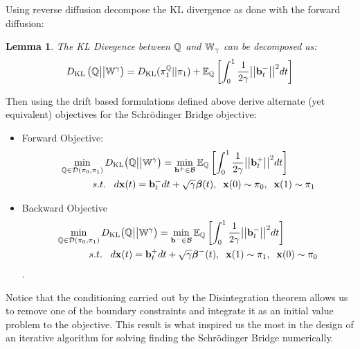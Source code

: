 \documentclass[a4paper,12pt,twoside,openright]{report}
\newtheorem{lemma}[theorem]{Lemma}
\theoremstyle{definition}
\begin{document}
Using reverse diffusion \cite{pavon1991free} decompose the KL divergence as done with the forward diffusion:
\begin{lemma}\citep{pavon1991free}
    The KL Divegence between ${\mathbb{Q}}$ and $\mathbb{W}_{\gamma}$ can be decomposed as:
\begin{align}\label{eq:free_energy_1}
     D_{\mathrm{KL}}\left({\mathbb{Q}} \big|\big| \mathbb{W}^{\gamma}\right) = D_{\mathrm{KL}}(\pi^{{\mathbb{Q}}}_1 || \pi_1) + \mathbb{E}_{\mathbb{Q}}\left[\int_0^1\frac{1}{2\gamma} \big|\big|{\mathbf{b}}^{-}_t\big|\big|^2 dt\right]
\end{align}
\end{lemma}
Then using the drift based formulations defined above \cite{pavon1991free} derive alternate (yet equivalent) objectives for the Schrödinger Bridge objective:

\begin{itemize}
\item Forward Objective: 
\begin{align} \label{eq:controlled_bridge_forward}
    \min_{{\mathbb{Q}} \in {\mathcal{D}}(\pi_0, \pi_1)} D_{\mathrm{KL}}\big({\mathbb{Q}} \big|\big| \mathbb{W}^{\gamma}\big)& = \min_{{\mathbf{b}}^{+} \in {\mathcal{B}} }  \mathbb{E}_{\mathbb{Q}}\left[\int_0^1 \frac{1}{2\gamma}\big|\big|{\mathbf{b}}^{+}_t \big|\big|^2 dt\right] \nonumber \\
    s.t.\;\;\; d{\mathbf{x}}(t) = {\mathbf{b}}^{-}_t &dt + \sqrt{\gamma} {\bm{\beta}}(t), \;\; {\mathbf{x}}(0) \sim \pi_0, \;\; {\mathbf{x}}(1) \sim \pi_1
\end{align}
\item Backward Objective
\begin{align} \label{eq:controlled_bridge_backward}
    \min_{{\mathbb{Q}} \in {\mathcal{D}}(\pi_0, \pi_1)} D_{\mathrm{KL}}\big({\mathbb{Q}} \big|\big| \mathbb{W}^{\gamma}\big)& = \min_{{\mathbf{b}}^{-} \in {\mathcal{B}} }  \mathbb{E}_{\mathbb{Q}}\left[\int_0^1 \frac{1}{2\gamma}\big|\big|{\mathbf{b}}^{-}_t \big|\big|^2 dt\right] \nonumber \\
    s.t.\;\;\; d{\mathbf{x}}(t) = {\mathbf{b}}^{+}_t &dt + \sqrt{\gamma} {\bm{\beta}}^{-}(t), \;\; {\mathbf{x}}(1) \sim \pi_1 , \;\; {\mathbf{x}}(0) \sim \pi_0
\end{align}.
\end{itemize}
Notice that the conditioning carried out by the Disintegration theorem allows us to remove one of the boundary constraints and integrate it as an initial value problem to the objective. This result is what inspired us the most in the design of an iterative algorithm for solving finding the Schrödinger Bridge numerically. 
\end{document}
